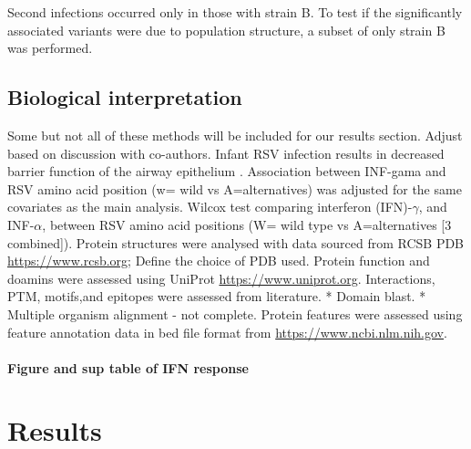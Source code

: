 \documentclass{article}
\begin{document}
Second infections occurred only in those with strain B. 
To test if the significantly associated variants were due to population structure, 
a subset of only strain B was performed. 

\subsection{Biological interpretation}
Some but not all of these methods will be included for our results section. 
Adjust based on discussion with co-authors.
Infant RSV infection results in decreased barrier function of the airway epithelium
\cite{connelly2021metabolic}.
Association between INF-gama and RSV amino acid position (w= wild vs A=alternatives) was adjusted for the same covariates as the main analysis. Wilcox test comparing interferon (IFN)-$\gamma$, and INF-$\alpha$, between RSV amino acid positions (W= wild type vs A=alternatives [3 combined]).
Protein structures were analysed with data sourced from 
RCSB PDB \url{https://www.rcsb.org}; Define the choice of PDB used. 
Protein function and doamins were assessed using 
UniProt	\url{https://www.uniprot.org}.
Interactions, PTM, motifs,and epitopes were assessed from literature. 
* Domain blast. 
* Multiple organism alignment - not complete.
Protein features were assessed using feature annotation data in bed file format from 
\url{https://www.ncbi.nlm.nih.gov}.
\paragraph{Figure and sup table of IFN response}

\section{Results}
\end{document}
